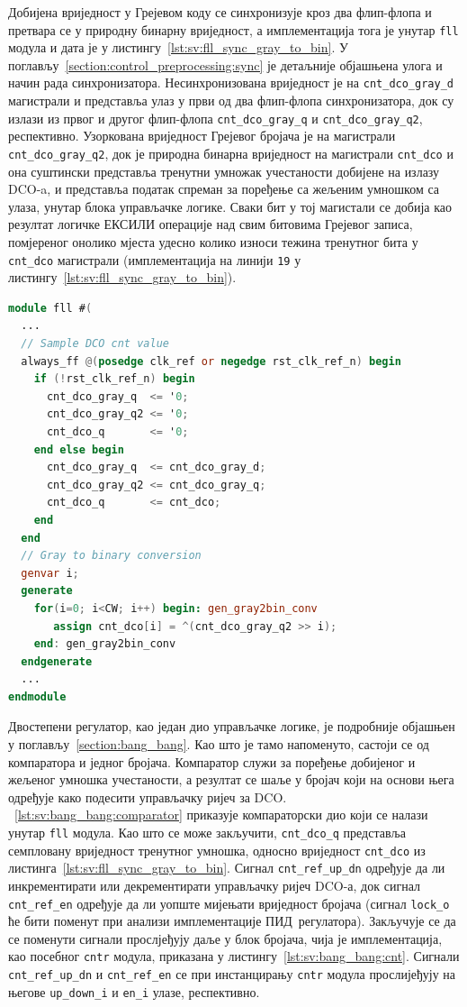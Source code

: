 \documentclass[master]{finthesis}
\newcommand*{\prog}[1]{\texttt{#1}}
\def \DCO  {DCO} %
\def \PID  {ПИД} %
\begin{document}
Добијена вриједност у Грејевом коду се синхронизује кроз два флип-флопа и претвара се у природну бинарну вриједност, а имплементација тога је унутар \prog{fll} модула и дата је у листингу~\ref{lst:sv:fll_sync_gray_to_bin}. У поглављу~\ref{section:control_preprocessing:sync} је детаљније објашњена улога и начин рада синхронизатора. Несинхронизована вриједност је на \prog{cnt\_dco\_gray\_d} магистрали и представља улаз у први од два флип-флопа синхронизатора, док су излази из првог и другог флип-флопа \prog{cnt\_dco\_gray\_q} и \prog{cnt\_dco\_gray\_q2}, респективно. Узоркована вриједност Грејевог бројача је на магистрали \prog{cnt\_dco\_gray\_q2}, док је природна бинарна вриједност на магистрали \prog{cnt\_dco} и она суштински представља тренутни умножак учестаности добијене на излазу \DCO-a, и представља податак спреман за поређење са жељеним умношком са улаза, унутар блока управљачке логике. Сваки бит у тој магистали се добија као резултат логичке ЕКСИЛИ операције над свим битовима Грејевог записа, помјереног онолико мјеста удесно колико износи тежина тренутног бита у \prog{cnt\_dco} магистрали (имплементација на линији \prog{19} у листингу~\ref{lst:sv:fll_sync_gray_to_bin}). \par
\begin{lstlisting}[language=Verilog, caption={Претварање Грејевог кода у природну бинарну вриједност.}, label={lst:sv:fll_sync_gray_to_bin}]
module fll #(
  ...
  // Sample DCO cnt value
  always_ff @(posedge clk_ref or negedge rst_clk_ref_n) begin
    if (!rst_clk_ref_n) begin
      cnt_dco_gray_q  <= '0;
      cnt_dco_gray_q2 <= '0;
      cnt_dco_q       <= '0;
    end else begin
      cnt_dco_gray_q  <= cnt_dco_gray_d;
      cnt_dco_gray_q2 <= cnt_dco_gray_q;
      cnt_dco_q       <= cnt_dco;
    end
  end
  // Gray to binary conversion
  genvar i;
  generate
    for(i=0; i<CW; i++) begin: gen_gray2bin_conv
       assign cnt_dco[i] = ^(cnt_dco_gray_q2 >> i);
    end: gen_gray2bin_conv
  endgenerate
  ...
endmodule
\end{lstlisting}
Двостепени регулатор, као један дио управљачке логике, је подробније објашњен у поглављу~\ref{section:bang_bang}. Као што је тамо напоменуто, састоји се од компаратора и једног бројача. Компаратор служи за поређење добијеног и жељеног умношка учестаности, а резултат се шаље у бројач који на основи њега одређује како подесити управљачку ријеч за \DCO. \lstlistingname~\ref{lst:sv:bang_bang:comparator} приказује компараторски дио који се налази унутар \prog{fll} модула. Као што се може закључити, \prog{cnt\_dco\_q} представља семпловану вриједност тренутног умношка, односно вриједност \prog{cnt\_dco} из листинга~\ref{lst:sv:fll_sync_gray_to_bin}. Сигнал \prog{cnt\_ref\_up\_dn} одређује да ли инкрементирати или декрементирати управљачку ријеч \DCO-а, док сигнал \prog{cnt\_ref\_en} одређује да ли уопште мијењати вриједност бројача (сигнал \prog{lock\_o} ће бити поменут при анализи имплементације \PID\ регулатора). Закључује се да се поменути сигнали прослјеђују даље у блок бројача, чија је имплементација, као посебног \prog{cntr} модула, приказана у листингу~\ref{lst:sv:bang_bang:cnt}. Сигнали \prog{cnt\_ref\_up\_dn} и \prog{cnt\_ref\_en} се при инстанцирању \prog{cntr} модула прослијеђују на његове \prog{up\_down\_i} и \prog{en\_i} улазе, респективно. \par
\end{document}
